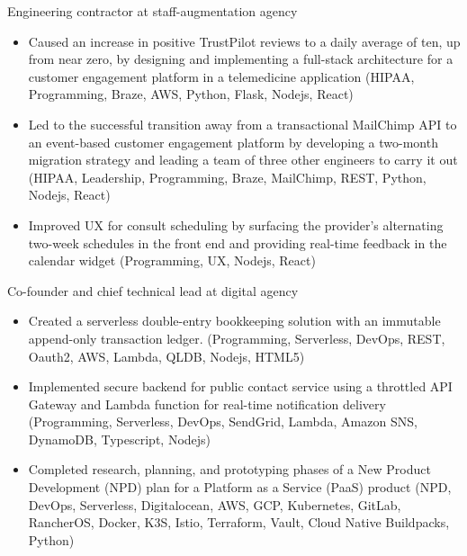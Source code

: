 


Engineering contractor at staff-augmentation agency

\begin{itemize}
  \item Caused an increase in positive TrustPilot reviews to a daily average of ten, up from near zero, by designing and implementing a full-stack architecture for a customer engagement platform in a telemedicine application {\tiny (HIPAA, Programming, Braze, AWS, Python, Flask, Nodejs, React)}
  \item Led to the successful transition away from a transactional MailChimp API to an event-based customer engagement platform by developing a two-month migration strategy and leading a team of three other engineers to carry it out {\tiny (HIPAA, Leadership, Programming, Braze, MailChimp, REST, Python, Nodejs, React)}
  \item Improved UX for consult scheduling by surfacing the provider's alternating two-week schedules in the front end and providing real-time feedback in the calendar widget {\tiny (Programming, UX, Nodejs, React)}
\end{itemize}

\divider



Co-founder and chief technical lead at digital agency

\begin{itemize}
  \item Created a serverless double-entry bookkeeping solution with an immutable append-only transaction ledger. {\tiny (Programming,  Serverless, DevOps, REST, Oauth2, AWS, Lambda,  QLDB, Nodejs, HTML5)}
  \item Implemented secure backend for public contact service using a throttled API Gateway and Lambda function for real-time notification delivery {\tiny (Programming, Serverless, DevOps, SendGrid, Lambda, Amazon SNS, DynamoDB, Typescript, Nodejs)}
  \item Completed research, planning, and prototyping phases of a New Product Development (NPD) plan for a Platform as a Service (PaaS) product {\tiny (NPD, DevOps, Serverless, Digitalocean, AWS, GCP, Kubernetes, GitLab, RancherOS, Docker, K3S, Istio, Terraform, Vault, Cloud Native Buildpacks, Python)}
\end{itemize}

